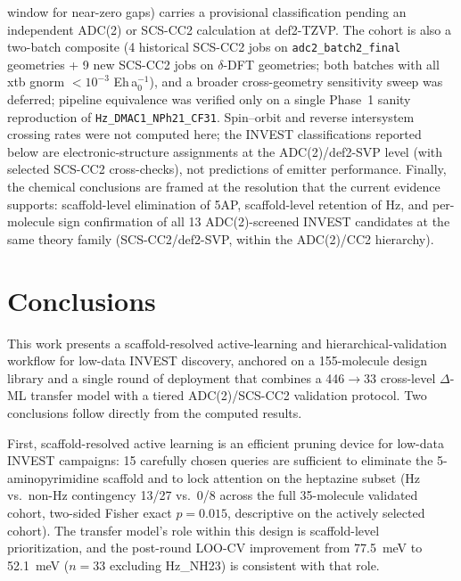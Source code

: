 \documentclass[journal=jcisd8,manuscript=article]{achemso}
\begin{document}
window for near-zero gaps) carries a provisional classification pending an independent ADC(2) or SCS-CC2 calculation at def2-TZVP. The cohort is also a two-batch composite (4 historical SCS-CC2 jobs on \texttt{adc2\_batch2\_final} geometries + 9 new SCS-CC2 jobs on $\delta$-DFT geometries; both batches with all xtb gnorm $<\!10^{-3}$ Eh\,a$_0^{-1}$), and a broader cross-geometry sensitivity sweep was deferred; pipeline equivalence was verified only on a single Phase~1 sanity reproduction of \texttt{Hz\_DMAC1\_NPh21\_CF31}. Spin--orbit and reverse intersystem crossing rates were not computed here; the INVEST classifications reported below are electronic-structure assignments at the ADC(2)/def2-SVP level (with selected SCS-CC2 cross-checks), not predictions of emitter performance. Finally, the chemical conclusions are framed at the resolution that the current evidence supports: scaffold-level elimination of 5AP, scaffold-level retention of Hz, and per-molecule sign confirmation of all 13 ADC(2)-screened INVEST candidates at the same theory family (SCS-CC2/def2-SVP, within the ADC(2)/CC2 hierarchy).


\section{Conclusions}

This work presents a scaffold-resolved active-learning and hierarchical-validation workflow for low-data INVEST discovery, anchored on a 155-molecule design library and a single round of deployment that combines a 446$\rightarrow$33 cross-level $\Delta$-ML transfer model with a tiered ADC(2)/SCS-CC2 validation protocol. Two conclusions follow directly from the computed results.

First, scaffold-resolved active learning is an efficient pruning device for low-data INVEST campaigns: 15 carefully chosen queries are sufficient to eliminate the 5-aminopyrimidine scaffold and to lock attention on the heptazine subset (Hz vs.\ non-Hz contingency 13/27 vs.\ 0/8 across the full 35-molecule validated cohort, two-sided Fisher exact $p=0.015$, descriptive on the actively selected cohort). The transfer model's role within this design is scaffold-level prioritization, and the post-round LOO-CV improvement from \SI{77.5}{meV} to \SI{52.1}{meV} ($n=33$ excluding Hz\_NH23) is consistent with that role.
\end{document}

